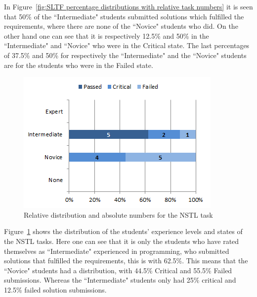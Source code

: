 \documentclass{sig-alternate-05-2015}
\begin{document}
In Figure~\ref{fig:SLTF percentage distributions with relative task numbers} it is seen that 50\% of the ``Intermediate" students submitted solutions which fulfilled the requirements, where there are none of the ``Novice" students who did. On the other hand one can see that it is respectively 12.5\% and 50\% in the ``Intermediate" and ``Novice" who were in the Critical state. The last percentages of 37.5\% and 50\% for respectively the ``Intermediate" and the ``Novice" students are for the students who were in the Failed state.

\begin{figure}[!ht]
	\centering
	\includegraphics[width=1\linewidth]{img08}
	\caption{Relative distribution and absolute numbers for the NSTL task}
	\label{fig:NSTL percentage distributions with relative task numbers}
\end{figure}

Figure~\ref{fig:NSTL percentage distributions with relative task numbers} shows the distribution of the students' experience levels and states of the NSTL tasks. Here one can see that it is only the students who have rated themselves as ``Inter\-mediate" experienced in programming, who submitted solutions that fulfilled the requirements, this is with 62.5\%. This means that the ``Novice" students had a distribution, with 44.5\% Critical and 55.5\% Failed submissions. Whereas the ``Inter\-mediate" students only had 25\% critical and 12.5\% failed solution submissions.
\end{document}
